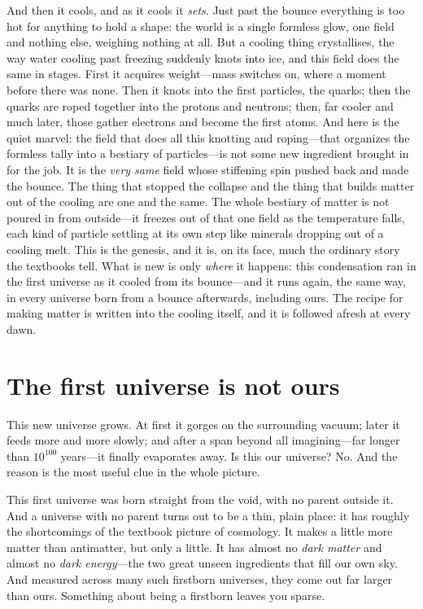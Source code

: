 And then it cools, and as it cools it \emph{sets}. Just past the bounce everything
is too hot for anything to hold a shape: the world is a single formless glow, one
field and nothing else, weighing nothing at all. But a cooling thing crystallises,
the way water cooling past freezing suddenly knots into ice, and this field does the
same in stages. First it acquires weight---mass switches on, where a moment before
there was none. Then it knots into the first particles, the quarks; then the quarks
are roped together into the protons and neutrons; then, far cooler and much later,
those gather electrons and become the first atoms. And here is the quiet marvel: the
field that does all this knotting and roping---that organizes the formless tally into a
bestiary of particles---is not some new ingredient brought in for the job. It is the
\emph{very same} field whose stiffening spin pushed back and made the bounce. The thing
that stopped the collapse and the thing that builds matter out of the cooling are one
and the same. The whole bestiary of matter is not poured in from outside---it freezes
out of that one field as the temperature falls, each kind of particle settling at its
own step like minerals dropping out of a cooling melt. This is the genesis, and it is, on its face, much the ordinary story
the textbooks tell. What is new is only \emph{where} it happens: this condensation
ran in the first universe as it cooled from its bounce---and it runs again, the same
way, in every universe born from a bounce afterwards, including ours. The recipe for
making matter is written into the cooling itself, and it is followed afresh at every
dawn.

\section*{The first universe is not ours}

This new universe grows. At first it gorges on the surrounding vacuum; later it
feeds more and more slowly; and after a span beyond all imagining---far longer
than $10^{100}$ years---it finally evaporates away. Is this our universe? No. And
the reason is the most useful clue in the whole picture.

This first universe was born straight from the void, with no parent outside it.
And a universe with no parent turns out to be a thin, plain place: it has roughly
the shortcomings of the textbook picture of cosmology. It makes a little more
matter than antimatter, but only a little. It has almost no \emph{dark matter} and
almost no \emph{dark energy}---the two great unseen ingredients that fill our own
sky. And measured across many such firstborn universes, they come out far larger
than ours. Something about being a firstborn leaves you sparse.

